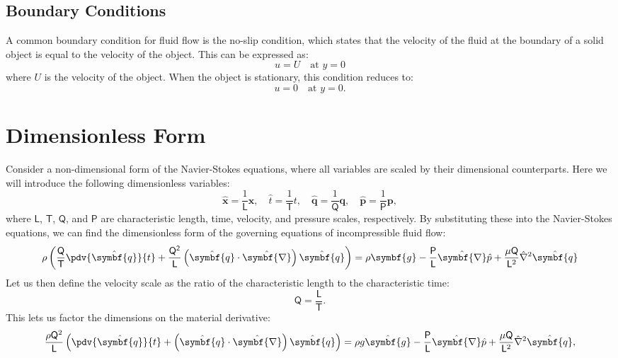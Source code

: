\documentclass{article}
\theoremstyle{definition}
\begin{document}
\subsection{Boundary Conditions}
A common boundary condition for fluid flow is the no-slip condition,
which states that the velocity of the fluid at the boundary of a solid
object is equal to the velocity of the object. This can be expressed
as:
\begin{equation*}
    u = U \quad \text{at } y = 0
\end{equation*}
where \(U\) is the velocity of the object. When the object is stationary,
this condition reduces to:
\begin{equation*}
    u = 0 \quad \text{at } y = 0.
\end{equation*}
\section{Dimensionless Form}
Consider a non-dimensional form of the Navier-Stokes equations, where
all variables are scaled by their dimensional counterparts. Here we
will introduce the following dimensionless variables:
\begin{equation*}
    \hat{\symbf{x}} = \frac{1}{\mathsf{L}} \symbf{x}, \quad \hat{t} = \frac{1}{\mathsf{T}} t, \quad \hat{\symbf{q}} = \frac{1}{\mathsf{Q}} \symbf{q}, \quad \hat{\symbf{p}} = \frac{1}{\mathsf{P}} \symbf{p},
\end{equation*}
where \(\mathsf{L}\), \(\mathsf{T}\), \(\mathsf{Q}\), and \(\mathsf{P}\)
are characteristic length, time, velocity, and pressure scales,
respectively. By substituting these into the Navier-Stokes equations,
we can find the dimensionless form of the governing equations of
incompressible fluid flow:
\begin{equation*}
    \rho \left( \frac{\mathsf{Q}}{\mathsf{T}} \pdv{\hat{\symbf{q}}}{t} + \frac{\mathsf{Q^2}}{\mathsf{L}} \left( \hat{\symbf{q}} \cdot \hat{\symbf{\nabla}} \right) \hat{\symbf{q}} \right) = \rho \symbf{g} - \frac{\mathsf{P}}{\mathsf{L}} \hat{\symbf{\nabla}} \hat{p} + \frac{\mu \mathsf{Q}}{\mathsf{L}^2} \hat{\nabla}^2 \hat{\symbf{q}}
\end{equation*}
Let us then define the velocity scale as the ratio of the characteristic
length to the characteristic time:
\begin{equation*}
    \mathsf{Q} = \frac{\mathsf{L}}{\mathsf{T}}.
\end{equation*}
This lets us factor the dimensions on the material derivative:
\begin{equation*}
    \frac{\rho \mathsf{Q}^2}{\mathsf{L}} \left( \pdv{\hat{\symbf{q}}}{t} + \left( \hat{\symbf{q}} \cdot \hat{\symbf{\nabla}} \right) \hat{\symbf{q}} \right) = \rho g \hat{\symbf{g}} - \frac{\mathsf{P}}{\mathsf{L}} \hat{\symbf{\nabla}} \hat{p} + \frac{\mu \mathsf{Q}}{\mathsf{L}^2} \hat{\nabla}^2 \hat{\symbf{q}},
\end{equation*}
\end{document}
